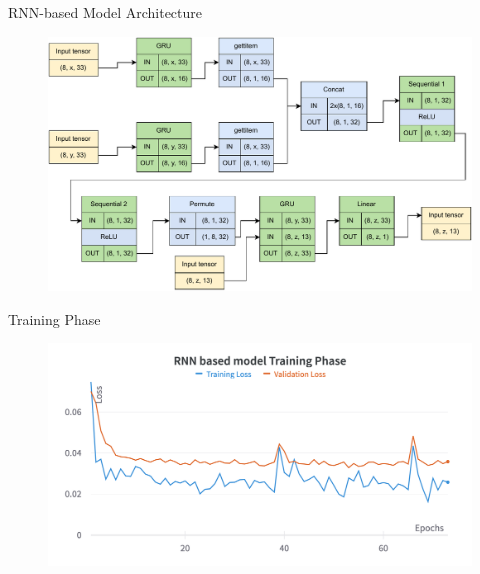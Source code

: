   \begin{frame}{RNN-based Model Architecture}
      \begin{figure}
          \centering
          \includegraphics[width=.95\textwidth]{sections/4_models/imgs/rnn/rnnarchitecture.pdf}
      \end{figure}
  \end{frame}
  
  \begin{frame}{Training Phase}
      \begin{figure}
          \centering
          \includegraphics[width=\textwidth]{sections/4_models/imgs/rnn/grruntraining.png}
      \end{figure}
  \end{frame}
  
